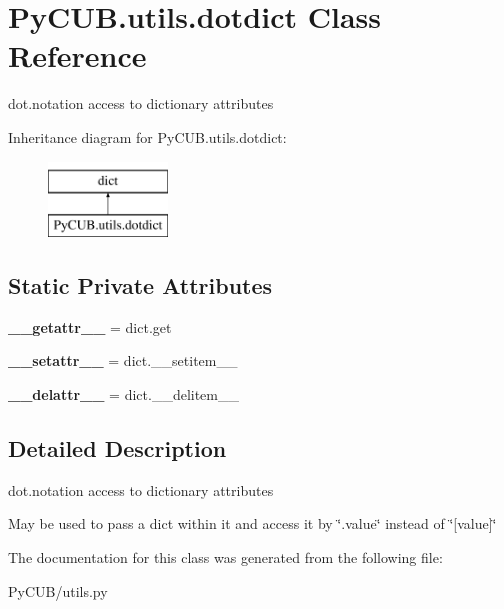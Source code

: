 \hypertarget{class_py_c_u_b_1_1utils_1_1dotdict}{}\section{Py\+C\+U\+B.\+utils.\+dotdict Class Reference}
\label{class_py_c_u_b_1_1utils_1_1dotdict}


dot.\+notation access to dictionary attributes  


Inheritance diagram for Py\+C\+U\+B.\+utils.\+dotdict\+:\begin{figure}[H]
\begin{center}
\leavevmode
\includegraphics[height=2.000000cm]{class_py_c_u_b_1_1utils_1_1dotdict}
\end{center}
\end{figure}
\subsection*{Static Private Attributes}
\begin{DoxyCompactItemize}
\item 
\mbox{\label{class_py_c_u_b_1_1utils_1_1dotdict_a4c07713d22df2a2119a45ab0f6080b2f}} 
{\bfseries \+\_\+\+\_\+getattr\+\_\+\+\_\+} = dict.\+get
\item 
\mbox{\label{class_py_c_u_b_1_1utils_1_1dotdict_ad4755019cc10a7987405ef5b30264f99}} 
{\bfseries \+\_\+\+\_\+setattr\+\_\+\+\_\+} = dict.\+\_\+\+\_\+setitem\+\_\+\+\_\+
\item 
\mbox{\label{class_py_c_u_b_1_1utils_1_1dotdict_aaee29383204f24926dcf68bf150e9d9c}} 
{\bfseries \+\_\+\+\_\+delattr\+\_\+\+\_\+} = dict.\+\_\+\+\_\+delitem\+\_\+\+\_\+
\end{DoxyCompactItemize}


\subsection{Detailed Description}
dot.\+notation access to dictionary attributes 

May be used to pass a dict within it and access it by \char`\"{}.\+value\char`\"{} instead of \char`\"{}\mbox{[}value\mbox{]}\char`\"{} 

The documentation for this class was generated from the following file\+:\begin{DoxyCompactItemize}
\item 
Py\+C\+U\+B/utils.\+py\end{DoxyCompactItemize}
